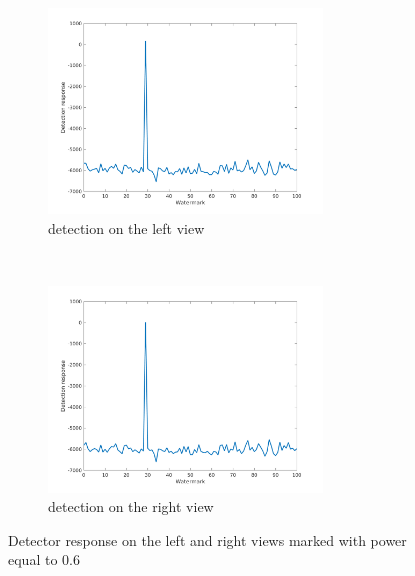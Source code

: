 \begin{figure}[h!]
    \centering
    \begin{subfigure}[t]{0.5\textwidth}
        \centering
\includegraphics[width=0.8\textwidth]{./img/likelihood/correct_LikelihoodL_06.png}
          \caption{\small{detection on the left view}}
\label{fig:Ll06}

    \end{subfigure}%
    ~ 
    \begin{subfigure}[t]{0.5\textwidth}
        \centering
\includegraphics[width=0.8\textwidth]{./img/likelihood/correct_LikelihoodLr_06.png}
           \caption{\small{detection on the right view}}
\label{fig:Lr06}
    \end{subfigure}
    \caption{Detector response on the left and right views marked with power equal to 0.6}
\end{figure}



